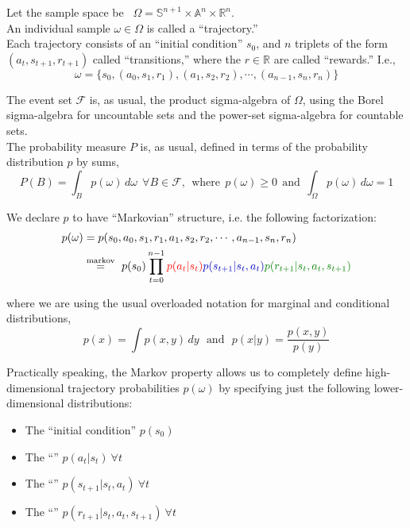 Let the sample space be \ $\Omega = \mathbb{S}^{n+1} \times \mathbb{A}^n \times \mathbb{R}^n$.\\
An individual sample $\omega \in \Omega$ is called a ``trajectory.''\\

Each trajectory consists of an ``initial condition'' $s_0$, and $n$ triplets of the form $(a_t, s_{t+1}, r_{t+1})$ called ``transitions,'' where the $r \in \mathbb{R}$ are called ``rewards.'' I.e.,
\begin{equation*}
\omega = \{s_0, (a_0, s_1, r_1), (a_1, s_2, r_2), \cdots, (a_{n-1}, s_{n}, r_n)\}
\end{equation*}

The event set $\mathcal{F}$ is, as usual, the product sigma-algebra of $\Omega$, using the Borel sigma-algebra for uncountable sets and the power-set sigma-algebra for countable sets.\\

The probability measure $P$ is, as usual, defined in terms of the probability distribution $p$ by sums,
\begin{equation*}
P(B) = \int_B p(\omega)\, d\omega\ \ \forall B \in \mathcal{F},\ \ \text{where}\ \ p(\omega)\geq0\ \ \text{and}\ \ \int_\Omega p(\omega)\,d\omega = 1
\end{equation*}

We declare $p$ to have ``Markovian'' structure, i.e. the following factorization:
\begin{align*}
p(\omega) &= p(s_0, a_0, s_1, r_1, a_1, s_2, r_2, \cdots, a_{n-1}, s_{n}, r_n)\\
&\stackrel{\text{markov}}{=}\ p(s_0) \prod_{t=0}^{n-1} \red{p(a_t|s_t)}\blue{p(s_{t+1}|s_t,a_t)}\green{p(r_{t+1}|s_t,a_t,s_{t+1})}
\end{align*}

where we are using the usual overloaded notation for marginal and conditional distributions,\\
\begin{equation*}
p(x) = \int p(x,y)\,dy\ \ \ \text{and}\ \ \ p(x|y) = \frac{p(x,y)}{p(y)}
\end{equation*}

Practically speaking, the Markov property allows us to completely define high-dimensional trajectory probabilities $p(\omega)$ by specifying just the following lower-dimensional distributions:
\begin{itemize}
  \item The ``initial condition'' $p(s_0)$
  \item The ``'' $p(a_t|s_t)\ \forall t$
  \item The ``'' $p(s_{t+1}|s_t,a_t)\ \forall t$
  \item The ``'' $p(r_{t+1}|s_t,a_t,s_{t+1})\ \forall t$
\end{itemize}

